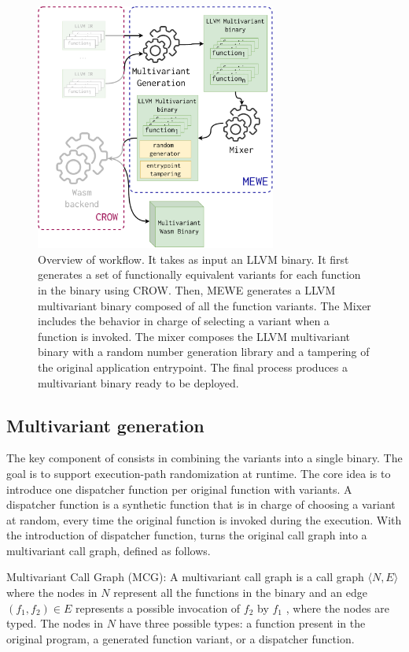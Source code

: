 \begin{figure}
  \centering
  \includegraphics[height=3.2in]{diagrams/MEWE.pdf}
  \caption{Overview of \tool workflow. It takes as input an LLVM binary. It first generates a set of functionally equivalent variants for each function in the binary using CROW. Then, MEWE generates a LLVM multivariant binary composed of all the function variants. The Mixer includes the behavior in charge of selecting a variant when a function is invoked. The \tool mixer composes the LLVM multivariant binary with a random number generation library and a tampering of the original application entrypoint. The final process produces a \wasm multivariant binary ready to be deployed. }
  \label{workflow}
\end{figure}


\subsection{Multivariant generation}

The key component of \tool consists in combining the variants into a single binary.
The goal is to support execution-path randomization at runtime.
The core idea is to introduce one dispatcher function per original function with variants.
A dispatcher function is a synthetic function that is in charge of choosing a variant at random, every time the original function is invoked during the execution.
With the introduction of dispatcher function,  \tool turns the original call graph into a multivariant call graph, defined as follows. 

\begin{definition}{Multivariant Call Graph (MCG):}\label{def:EP}
    A multivariant call graph is a call graph $\langle N, E \rangle$ where the nodes in $N$ represent all the functions in the binary and an edge $(f_1,f_2) \in E$ represents a possible invocation of $f_2$ by $f_1$  \cite{ryder1979}, where the nodes are typed. The nodes in $N$ have three possible types: a function present in the original program,  a generated function variant, or a dispatcher function.
\end{definition}


